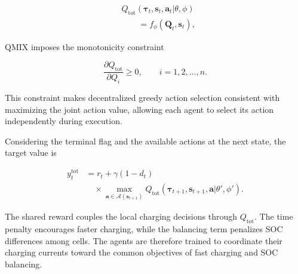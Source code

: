 \begin{equation}
\label{Q-value}
\begin{aligned}
&Q_{\mathrm{tot}}
(\boldsymbol{\tau}_t,\mathbf{s}_t,\mathbf{a}_t|\theta,\phi)\\
&\qquad=f_{\phi}(\mathbf{Q}_t,\mathbf{s}_t),
\end{aligned}
\end{equation}


QMIX imposes the monotonicity constraint

\begin{equation}
\label{QMIX_constraints}
\frac{\partial Q_{\mathrm{tot}}}{\partial Q_i}
\geq 0,
\qquad
i=1,2,\ldots,n.
\end{equation}

This constraint makes decentralized greedy action selection consistent with maximizing the joint action value, allowing each agent to select its action independently during execution.

 Considering the terminal flag and the available actions at the next state, the target value is


\begin{equation}
\label{target Q}
\begin{aligned}
y_t^{\mathrm{tot}}
&=r_t+\gamma(1-d_t)\\
&\quad\times\max_{\mathbf{a}\in\mathcal{A}(\mathbf{s}_{t+1})}
Q_{\mathrm{tot}}
(\boldsymbol{\tau}_{t+1},\mathbf{s}_{t+1},\mathbf{a}|\theta',\phi').
\end{aligned}
\end{equation}

The shared reward couples the local charging decisions through $Q_{\mathrm{tot}}$. The time penalty encourages faster charging, while the balancing term penalizes SOC differences among cells. The agents are therefore trained to coordinate their charging currents toward the common objectives of fast charging and SOC balancing.

